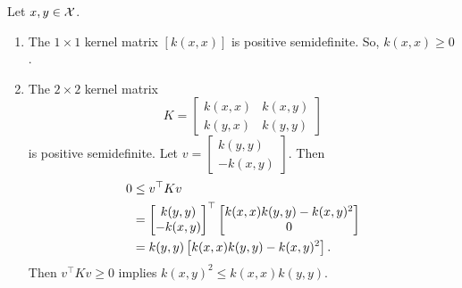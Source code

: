 Let \(x,y \in \mathcal{X}\).
\begin{enumerate}
    \item The \(1 \times 1\) kernel matrix \([k(x,x)]\) is positive semidefinite.
    So, \(k(x,x) \geq 0\).
    \item The \(2 \times 2\) kernel matrix
    \begin{equation}
        K = \begin{bmatrix}
            k(x,x) & k(x,y) \\ k(y,x) & k(y,y)
        \end{bmatrix}
    \end{equation}
    is positive semidefinite.
    Let \(v = \begin{bmatrix}
        k(y,y) \\ -k(x,y)
    \end{bmatrix}\).
    Then
    \begin{align}
        0 &\leq v^\top K v\\
        &= \begin{bmatrix}
            k(y,y) \\ -k(x,y)
        \end{bmatrix}^\top
        \begin{bmatrix}
            k(x,x)k(y,y) - k(x,y)^2 \\ 0
        \end{bmatrix}
        \notag\\
        &= k(y,y) \left[
            k(x,x)k(y,y) - k(x,y)^2
        \right].
        \notag
    \end{align}
    Then \(v^\top K v \geq 0\) implies \(k(x,y)^2 \leq k(x,x) k(y,y)\).
    \qedhere
\end{enumerate}